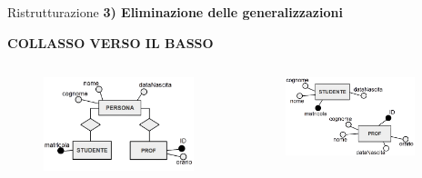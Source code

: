 \begin{frame}{Ristrutturazione}
\textbf{3) Eliminazione delle generalizzazioni}
\\\vspace{2em}
\begin{center}
    \textbf{COLLASSO VERSO IL BASSO}
\end{center}
\begin{columns}
        \begin{column}{0.5\textwidth}
            \begin{figure}[h]
        \centering
        \includegraphics[width=1\textwidth]{img/i6.png}
    \end{figure}
        \end{column}
        \begin{column}{0.5\textwidth}
            \begin{figure}[h]
        \centering
        \includegraphics[width=0.9\textwidth]{img/i9.png}
    \end{figure}
        \end{column}
    \end{columns}
\end{frame}
